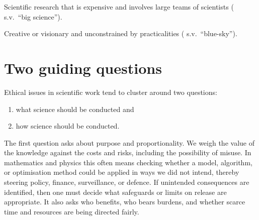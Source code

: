 \documentclass[
  a4paper,
  DIV=11,
  numbers=noendperiod,
  oneside]{scrreprt}
\providecommand{\tightlist}{%
  \setlength{\itemsep}{0pt}\setlength{\parskip}{0pt}}
\begin{document}
\begin{tcolorbox}[enhanced jigsaw, colframe=quarto-callout-note-color-frame, title={big science}, breakable, opacityback=0, titlerule=0mm, colbacktitle=quarto-callout-note-color!10!white, toptitle=1mm, colback=white, coltitle=black, toprule=.15mm, bottomtitle=1mm, left=2mm, arc=.35mm, rightrule=.15mm, bottomrule=.15mm, opacitybacktitle=0.6, leftrule=.75mm]

Scientific research that is expensive and involves large teams of
scientists ( s.v.~``big science'').

\end{tcolorbox}

\begin{tcolorbox}[enhanced jigsaw, colframe=quarto-callout-note-color-frame, title={blue-sky}, breakable, opacityback=0, titlerule=0mm, colbacktitle=quarto-callout-note-color!10!white, toptitle=1mm, colback=white, coltitle=black, toprule=.15mm, bottomtitle=1mm, left=2mm, arc=.35mm, rightrule=.15mm, bottomrule=.15mm, opacitybacktitle=0.6, leftrule=.75mm]

Creative or visionary and unconstrained by practicalities
(
s.v.~``blue-sky'').

\end{tcolorbox}

\section{Two guiding questions}\label{two-guiding-questions}

Ethical issues in scientific work tend to cluster around two questions:

\begin{enumerate}
\def\labelenumi{\arabic{enumi}.}
\tightlist
\item
  what science should be conducted and
\item
  how science should be conducted.
\end{enumerate}

The first question asks about purpose and proportionality. We weigh the
value of the knowledge against the costs and risks, including the
possibility of misuse. In mathematics and physics this often means
checking whether a model, algorithm, or optimisation method could be
applied in ways we did not intend, thereby steering policy, finance,
surveillance, or defence. If unintended consequences are identified,
then one must decide what safeguards or limits on release are
appropriate. It also asks who benefits, who bears burdens, and whether
scarce time and resources are being directed fairly.
\end{document}
